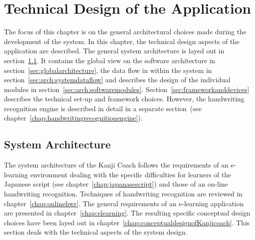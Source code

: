 
\chapter{Technical Design of the Application}
\label{chap:technicaldesign}




The focus of this chapter is on the general architectural choices made during
the development of the system. In this chapter, the technical design aspects 
of the application are described. The general system architecture is layed out in
section~\ref{sec:systemarchitecture}. It contains the global view on the software
architecture in section~\ref{sec:globalarchitecture}, the data flow in within
the system in section~\ref{sec:arch:systemdataflow} and describes the design
of the individual modules in section~\ref{sec:arch:softwaremodules}.
Section~\ref{sec:frameworkanddevices} describes the technical set-up and 
framework choices. However, the handwriting recognition engine is described 
in detail in a separate 
section~(see chapter~\ref{chap:handwritingrecognitionengine}).

\section{System Architecture}
\label{sec:systemarchitecture}

The system architecture of the Kanji Coach follows the requirements of an 
e-learning environment dealing with the specific difficulties for learners 
of the Japanese script (see chapter~\ref{chap:japanasescript}) and those of an 
on-line handwriting recognition. Techniques of handwriting recognition are 
reviewed in chapter~\ref{chap:onlinehwr}. The general requirements of an 
e-learning application are presented in chapter~\ref{chap:elearning}. 
The resulting specific conceptual design choices have been 
layed out in chapter~\ref{chap:conceptualdesignofKanjicoach}. This
section deals with the technical aspects of the system design.

